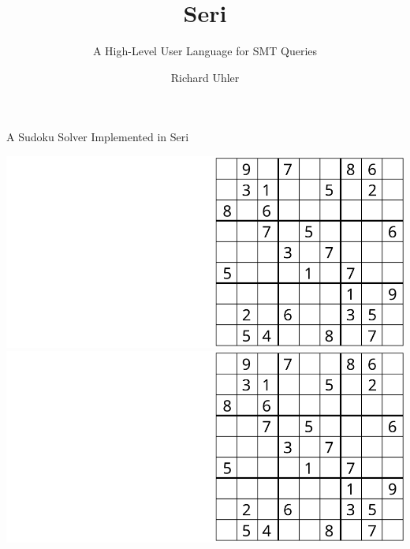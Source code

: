 \documentclass{beamer}
\title{Seri}
\subtitle{A High-Level User Language for SMT Queries}
\author{Richard Uhler}
\begin{document}
\begin{frame}
    \titlepage
\end{frame}

\begin{frame}{A Sudoku Solver Implemented in Seri}
\begin{overprint}
 \includegraphics[width=\textwidth]{input1}
 \includegraphics[width=\textwidth]{input2}
\end{overprint}
\end{frame}
 
\end{document}
